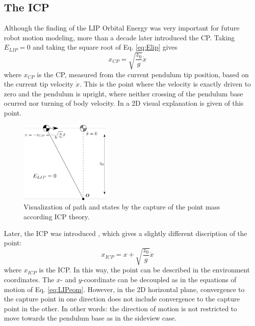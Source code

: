 \subsection{The \acf{ICP}}
Although the finding of the \ac{LIP} Orbital Energy was very important for future robot motion modeling, more than a decade later \cite{pratt2006capture} introduced the \ac{CP}. Taking $E_{LIP}=0$ and taking the square root of Eq.  \eqref{eq:Elip} gives
\begin{equation}
x_{CP}=\sqrt{ \frac{z_0}{g}}\dot{x} 
\label{eq:cp}
\end{equation}
where $x_{CP}$ is the \ac{CP}, measured from the current pendulum tip position, based on the current tip velocity $\dot{x}$. This is the point where the velocity is exactly driven to zero and the pendulum is upright, where neither crossing of the pendulum base ocurred nor turning of body velocity. In  a \ac{2D} visual explanation is given of this point.
\begin{figure}[h]
\centering
\includegraphics[width=0.4\textwidth]{STYLESTUFF/2DICP.png}
\caption{Visualization of path and states by the capture of the point mass according \ac{ICP} theory.}
\label{fig:2dicp}
\end{figure}
Later, the \ac{ICP} was introduced \cite{koolen2012capturability}, which gives a slightly different discription of the point:
\begin{equation}
x_{ICP}=x+\sqrt{ \frac{z_0}{g}}\dot{x} 
\label{eq:icp}
\end{equation}
where $x_{ICP}$ is the \ac{ICP}. In this way, the point can be described in the environment coordinates.
The $x$- and $y$-coordinate can be decoupled as in the equations of motion of Eq. \eqref{eq:LIPeom}. However, in the \ac{2D} horizontal plane, convergence to the capture point in one direction does not include convergence to the capture point in the other. In other words: the direction of motion is not restricted to move towards the pendulum base as in the sideview case.
